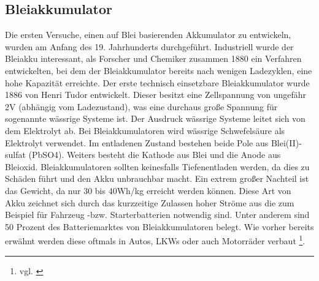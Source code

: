 \subsection{Bleiakkumulator}
Die ersten Versuche, einen auf Blei basierenden Akkumulator zu entwickeln, wurden am Anfang des 19. Jahrhunderts durchgeführt. Industriell wurde der Bleiakku interessant, als Forscher und Chemiker zusammen 1880 ein Verfahren entwickelten, bei dem der Bleiakkumulator bereits nach wenigen Ladezyklen, eine hohe Kapazität erreichte. Der erste technisch einsetzbare Bleiakkumulator wurde 1886 von Henri Tudor entwickelt. Dieser besitzt eine Zellspannung von ungefähr 2V (abhängig vom Ladezustand), was eine durchaus große Spannung für sogenannte wässrige Systeme ist. Der Ausdruck wässrige Systeme leitet sich von dem Elektrolyt ab. Bei Bleiakkumulatoren wird wässrige Schwefelsäure als Elektrolyt verwendet. Im entladenen Zustand bestehen beide Pole aus Blei(II)-sulfat (PbSO4). Weiters besteht die Kathode aus Blei und die Anode aus Bleioxid. Bleiakkumulatoren sollten keinesfalls Tiefenentladen werden, da dies zu Schäden führt und den Akku unbrauchbar macht. Ein extrem großer Nachteil ist das Gewicht, da nur 30 bis 40Wh/kg erreicht werden können.
Diese Art von Akku zeichnet sich durch das kurzzeitige Zulassen hoher Ströme aus die zum Beispiel für Fahrzeug -bzw. Starterbatterien notwendig sind. Unter anderem sind 50 Prozent des Batteriemarktes von Bleiakkumulatoren belegt. Wie vorher bereits erwähnt werden diese oftmals in Autos, LKWs oder auch Motorräder verbaut \footnote{vgl. \cite{Bleiakkumulator}}.

